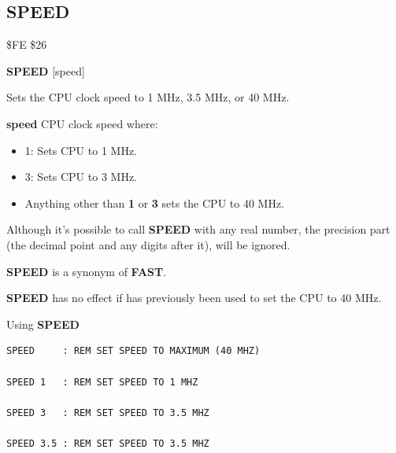
\newpage
\subsection{SPEED}
\begin{description}[leftmargin=2cm,style=nextline]
\item [Token:]    \$FE \$26

\item [Format:]   {\bf SPEED} [speed]

\item [Usage:]    Sets the CPU clock speed to 1 MHz, 3.5 MHz, or 40 MHz.

                  {\bf speed} CPU clock speed where:
                  \begin{itemize}
                     \item 1: Sets CPU to 1 MHz.
                     \item 3: Sets CPU to 3 MHz.
                     \item Anything other than {\bf 1} or {\bf 3} sets the CPU to 40 MHz.
                  \end{itemize}

\item [Remarks:]  Although it's possible to call {\bf SPEED} with any real number, the precision part (the decimal point and any digits after it), will be ignored.

                  {\bf SPEED} is a synonym of {\bf FAST}.

                  {\bf SPEED} has no effect if  has previously been used to set the CPU to 40 MHz.

\item [Examples:] Using {\bf SPEED}

\begin{tcolorbox}[colback=black,coltext=white]
\verbatimfont{\codefont}
\begin{verbatim}
SPEED     : REM SET SPEED TO MAXIMUM (40 MHZ)

SPEED 1   : REM SET SPEED TO 1 MHZ

SPEED 3   : REM SET SPEED TO 3.5 MHZ

SPEED 3.5 : REM SET SPEED TO 3.5 MHZ
\end{verbatim}
\end{tcolorbox}
\end{description}


